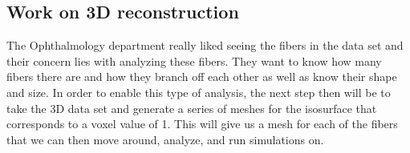 \documentclass[11pt,psfig]{article}
\begin{document}
\subsection*{Work on 3D reconstruction}

The Ophthalmology department really liked seeing the fibers in the data set and their concern lies with analyzing these fibers. They want to know how many fibers there are and how they branch off each other as well as know their shape and size. In order to enable this type of analysis, the next step then will be to take the 3D data set and generate a series of meshes for the isosurface that corresponds to a voxel value of 1. This will give us a mesh for each of the fibers that we can then move around, analyze, and run simulations on.  
\end{document}
